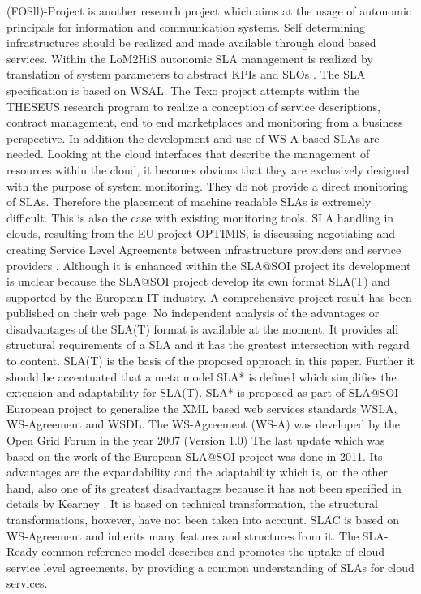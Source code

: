 (FOSll)-Project \cite{fosii} is another research project which aims at the usage of autonomic principals for information and communication systems. Self determining infrastructures should be realized and made available through cloud based services. Within the LoM2HiS autonomic SLA management is realized by translation of system parameters to abstract KPIs and SLOs  \cite{Brandic:2009:VFE:1616056.1616063}. The SLA specification is based on WSAL. The Texo project \cite{texo2011} attempts within the THESEUS research program to realize a conception of service descriptions, contract management, end to end marketplaces and monitoring from a business perspective. In addition the development and use of WS-A based SLAs are needed. Looking at the cloud interfaces that describe the management of resources within the cloud, it becomes obvious that they are exclusively designed with the purpose of system monitoring. They do not provide a direct monitoring of SLAs. Therefore the placement of machine readable SLAs is extremely difficult. This is also the case with existing monitoring tools. SLA handling in clouds, resulting from the EU project OPTIMIS, is discussing negotiating and creating Service Level Agreements between infrastructure providers and service providers \cite{Lawrence:2010:USL:2050107.2050112}. Although it is enhanced within the SLA@SOI project \cite{slasoi2011} its development is unclear because the SLA@SOI project develop its own format SLA(T) \cite{slasoiwiki} and supported by the European IT industry. A comprehensive project result has been published on their web page. No independent analysis of the advantages or disadvantages of the SLA(T) format is available at the moment. It provides all structural requirements of a SLA and it has the greatest intersection with regard to content. SLA(T) is the basis of the proposed approach in this paper. Further it should be accentuated that a meta model SLA* \cite{slasoisrc} is defined which simplifies the extension and adaptability for SLA(T). SLA* is proposed as part of SLA@SOI European project to generalize the XML based web services standards WSLA, WS-Agreement and WSDL. The WS-Agreement (WS-A) was developed by the Open Grid Forum in the year 2007 (Version 1.0) The last update which was based on the work of the European SLA@SOI project was done in 2011. Its advantages are the expandability and the adaptability which is, on the other hand, also one of its greatest disadvantages because it has not been specified in details by Kearney \cite{Kearney2011b}. It is based on technical transformation, the structural transformations, however, have not been taken into account. SLAC \cite{uriarte2014slac} is based on WS-Agreement and inherits many features and structures from it. The SLA-Ready\cite{SLA-Ready} common reference model describes and promotes the uptake of cloud service level agreements, by providing a common understanding of SLAs for cloud services.



